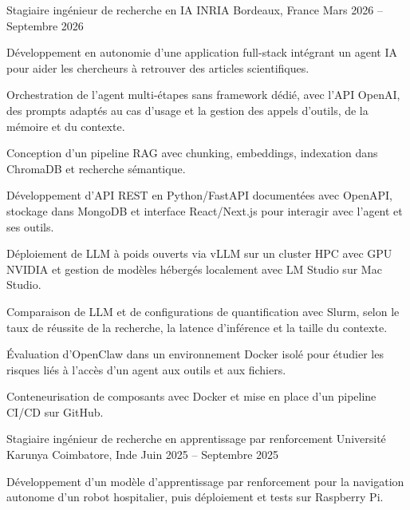 
\begin{cventries}
  \cventry
    {Stagiaire ingénieur de recherche en IA}
    {INRIA}
    {Bordeaux, France}
    {Mars 2026 -- Septembre 2026}
    {
      \begin{cvitems}
        \item {Développement en autonomie d’une application full-stack intégrant un agent IA pour aider les chercheurs à retrouver des articles scientifiques.}
        \item {Orchestration de l’agent multi-étapes sans framework dédié, avec l’API OpenAI, des prompts adaptés au cas d’usage et la gestion des appels d’outils, de la mémoire et du contexte.}
        \item {Conception d’un pipeline RAG avec chunking, embeddings, indexation dans ChromaDB et recherche sémantique.}
        \item {Développement d’API REST en Python/FastAPI documentées avec OpenAPI, stockage dans MongoDB et interface React/Next.js pour interagir avec l’agent et ses outils.}
        \item {Déploiement de LLM à poids ouverts via vLLM sur un cluster HPC avec GPU NVIDIA et gestion de modèles hébergés localement avec LM Studio sur Mac Studio.}
        \item {Comparaison de LLM et de configurations de quantification avec Slurm, selon le taux de réussite de la recherche, la latence d’inférence et la taille du contexte.}
        \item {Évaluation d’OpenClaw dans un environnement Docker isolé pour étudier les risques liés à l’accès d’un agent aux outils et aux fichiers.}
        \item {Conteneurisation de composants avec Docker et mise en place d’un pipeline CI/CD sur GitHub.}
      \end{cvitems}
    }

  \cventry
    {Stagiaire ingénieur de recherche en apprentissage par renforcement}
    {Université Karunya}
    {Coimbatore, Inde}
    {Juin 2025 -- Septembre 2025}
    {
      \begin{cvitems}
        \item {Développement d’un modèle d’apprentissage par renforcement pour la navigation autonome d’un robot hospitalier, puis déploiement et tests sur Raspberry Pi.}
      \end{cvitems}
    }
\end{cventries}
